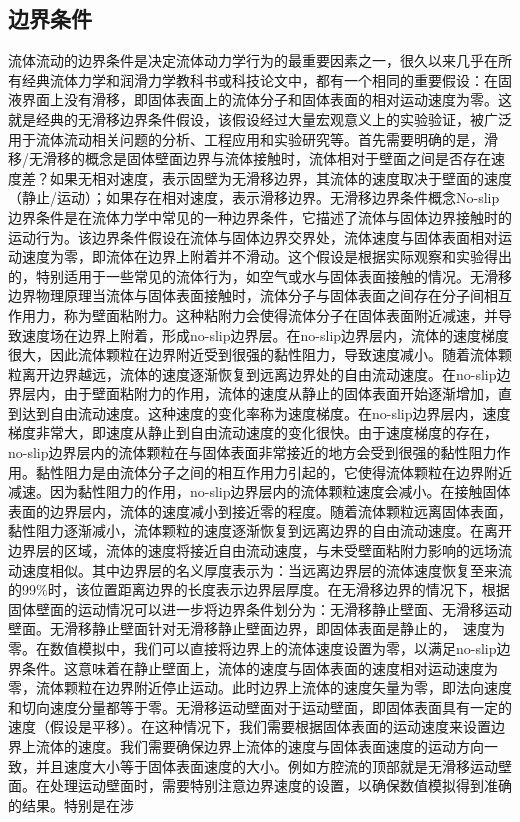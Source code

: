 \documentclass{article}
\numberwithin{equation}{section}    %
\begin{document}
\subsection{边界条件}

流体流动的边界条件是决定流体动力学行为的最重要因素之一，很久以来几乎在所有经典流体力学和润滑力学教科书或科技论文中，都有一个相同的重要假设：在固液界面上没有滑移，即固体表面上的流体分子和固体表面的相对运动速度为零。这就是经典的无滑移边界条件假设，该假设经过大量宏观意义上的实验验证，被广泛用于流体流动相关问题的分析、工程应用和实验研究等。首先需要明确的是，滑移/无滑移的概念是固体壁面边界与流体接触时，流体相对于壁面之间是否存在速度差？如果无相对速度，表示固壁为无滑移边界，其流体的速度取决于壁面的速度（静止/运动）；如果存在相对速度，表示滑移边界。无滑移边界条件概念No-slip边界条件是在流体力学中常见的一种边界条件，它描述了流体与固体边界接触时的运动行为。该边界条件假设在流体与固体边界交界处，流体速度与固体表面相对运动速度为零，即流体在边界上附着并不滑动。这个假设是根据实际观察和实验得出的，特别适用于一些常见的流体行为，如空气或水与固体表面接触的情况。无滑移边界物理原理当流体与固体表面接触时，流体分子与固体表面之间存在分子间相互作用力，称为壁面粘附力。这种粘附力会使得流体分子在固体表面附近减速，并导致速度场在边界上附着，形成no-slip边界层。在no-slip边界层内，流体的速度梯度很大，因此流体颗粒在边界附近受到很强的黏性阻力，导致速度减小。随着流体颗粒离开边界越远，流体的速度逐渐恢复到远离边界处的自由流动速度。在no-slip边界层内，由于壁面粘附力的作用，流体的速度从静止的固体表面开始逐渐增加，直到达到自由流动速度。这种速度的变化率称为速度梯度。在no-slip边界层内，速度梯度非常大，即速度从静止到自由流动速度的变化很快。由于速度梯度的存在，no-slip边界层内的流体颗粒在与固体表面非常接近的地方会受到很强的黏性阻力作用。黏性阻力是由流体分子之间的相互作用力引起的，它使得流体颗粒在边界附近减速。因为黏性阻力的作用，no-slip边界层内的流体颗粒速度会减小。在接触固体表面的边界层内，流体的速度减小到接近零的程度。随着流体颗粒远离固体表面，黏性阻力逐渐减小，流体颗粒的速度逐渐恢复到远离边界的自由流动速度。在离开边界层的区域，流体的速度将接近自由流动速度，与未受壁面粘附力影响的远场流动速度相似。其中边界层的名义厚度表示为：当远离边界层的流体速度恢复至来流的99\%时，该位置距离边界的长度表示边界层厚度。在无滑移边界的情况下，根据固体壁面的运动情况可以进一步将边界条件划分为：无滑移静止壁面、无滑移运动壁面。无滑移静止壁面针对无滑移静止壁面边界，即固体表面是静止的， 速度为零。在数值模拟中，我们可以直接将边界上的流体速度设置为零，以满足no-slip边界条件。这意味着在静止壁面上，流体的速度与固体表面的速度相对运动速度为零，流体颗粒在边界附近停止运动。此时边界上流体的速度矢量为零，即法向速度和切向速度分量都等于零。无滑移运动壁面对于运动壁面，即固体表面具有一定的速度（假设是平移）。在这种情况下，我们需要根据固体表面的运动速度来设置边界上流体的速度。我们需要确保边界上流体的速度与固体表面速度的运动方向一致，并且速度大小等于固体表面速度的大小。例如方腔流的顶部就是无滑移运动壁面。在处理运动壁面时，需要特别注意边界速度的设置，以确保数值模拟得到准确的结果。特别是在涉
\end{document}
